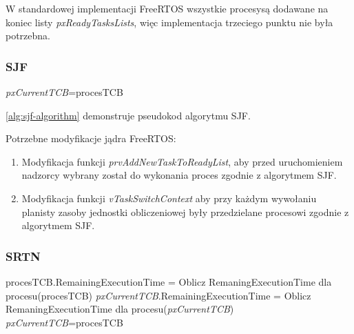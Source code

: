 \documentclass[../../main]{subfiles}
\begin{document}
W standardowej implementacji FreeRTOS wszystkie procesysą dodawane na koniec listy \textit{pxReadyTasksLists}, więc implementacja trzeciego punktu nie była potrzebna.

\subsubsection{SJF}

\begin{algorithm}
\caption{Pseudokod algorytmu SJF}\label{alg:sjf-algorithm}
\begin{algorithmic}[1]
        \State \textit{pxCurrentTCB}=procesTCB
    \EndIf
\EndFor
\end{algorithmic}
\end{algorithm}

\cref{alg:sjf-algorithm} demonstruje pseudokod algorytmu SJF.

Potrzebne modyfikacje jądra FreeRTOS:

\begin{enumerate}
    \item Modyfikacja funkcji \textit{prvAddNewTaskToReadyList}, aby przed uruchomieniem nadzorcy wybrany został do wykonania proces zgodnie z algorytmem SJF.
    \item Modyfikacja funkcji \textit{vTaskSwitchContext} aby przy każdym wywołaniu planisty zasoby jednostki obliczeniowej były przedzielane procesowi zgodnie z algorytmem SJF.
\end{enumerate}

\subsubsection{SRTN}

\begin{algorithm}
\caption{Pseudokod algorytmu SRTN}\label{alg:srtn-algorithm}
\begin{algorithmic}[1]
    \State procesTCB.RemainingExecutionTime = Oblicz RemaningExecutionTime dla procesu(procesTCB)
    \State \textit{pxCurrentTCB}.RemainingExecutionTime = Oblicz RemaningExecutionTime dla procesu(\textit{pxCurrentTCB})
        \State \textit{pxCurrentTCB}=procesTCB
    \EndIf
\EndFor
\end{algorithmic}
\end{algorithm}
\end{document}
